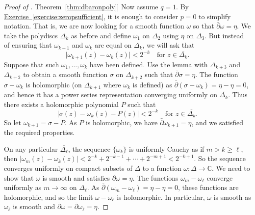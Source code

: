 \documentclass[12pt,openany]{book}
\newcommand{\sabs}[1]{\lvert {#1} \rvert}
\newcommand{\C}{{\mathbb{C}}}
\theoremstyle{plain}
\theoremstyle{remark}
\theoremstyle{definition}
\theoremstyle{exercise}
\theoremstyle{example}
\newcommand{\exerciseref}[1]{\hyperref[#1]{Exercise~\ref*{#1}}}
\newcommand{\thmref}[1]{\hyperref[#1]{Theorem~\ref*{#1}}}
\begin{document}
\begin{proof}[Proof of \thmref{thm:dbaronpoly}]
Now assume $q=1$.  By \exerciseref{exercise:zeropsufficient}, it is enough
to consider $p=0$ to simplify notation.  That is, we are now looking for
a smooth function $\omega$ so that $\bar{\partial}\omega = \eta$.
We take the polydiscs $\Delta_k$ as before and define $\omega_1$
on $\Delta_2$ using $\eta$ on $\Delta_3$.
But instead of ensuring that $\omega_{k+1}$ and $\omega_k$
are equal on $\Delta_k$, we will ask that
\begin{equation*}
\sabs{\omega_{k+1}(z)-\omega_{k}(z)} < 2^{-k}
\quad
\text{for } z \in \overline{\Delta_k} .
\end{equation*}
Suppose that such $\omega_1,\ldots,\omega_k$ have been defined.
Use the lemma with $\Delta_{k+3}$ and $\Delta_{k+2}$ to obtain a smooth function
$\sigma$ on $\Delta_{k+2}$ such that
$\bar{\partial} \sigma = \eta$.
The function $\sigma-\omega_k$ is holomorphic (on $\Delta_{k+1}$ where
$\omega_k$ is defined) as
$\bar{\partial}(\sigma-\omega_k) = \eta-\eta = 0$, and hence it has a power
series representation converging uniformly on $\overline{\Delta_k}$.  Thus there exists a
holomorphic polynomial $P$ such that
\begin{equation*}
\sabs{\sigma(z)-\omega_{k}(z) - P(z)} < 2^{-k}
\quad
\text{for } z \in \overline{\Delta_k} .
\end{equation*}
So let $\omega_{k+1} = \sigma-P$.  As $P$ is holomorphic,
we have $\bar{\partial}\omega_{k+1} = \eta$, and we satisfied the
required properties.

On any particular $\overline{\Delta_\ell}$, the sequence $\{ \omega_k \}$ is
uniformly Cauchy as if $m > k \geq \ell$, then
$\sabs{\omega_{m}(z)-\omega_k(z)} <
2^{-k}+2^{-k-1} +\cdots+2^{-m+1} < 2^{-k+1}$.  So the sequence converges
uniformly on compact subsets of $\Delta$ to a function $\omega \colon \Delta
\to \C$.  We need to show that
$\omega$ is smooth and satisfies $\bar{\partial} \omega = \eta$.
The functions
$\omega_{m}-\omega_\ell$
converge uniformly as $m \to \infty$ on $\Delta_{\ell}$.
As
$\bar{\partial}(\omega_m-\omega_\ell) = \eta-\eta = 0$, these functions
are holomorphic, and so the limit $\omega -\omega_\ell$ is holomorphic.
In particular, $\omega$ is smooth as $\omega_\ell$ is smooth and
$\bar{\partial}\omega = \bar{\partial}\omega_\ell = \eta$.
\end{proof}
\end{document}
